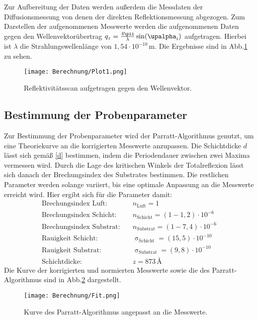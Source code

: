 Zur Aufbereitung der Daten werden außerdem die Messdaten der Diffusionsmessung von denen der direkten Reflektionsmessung abgezogen. Zum Darstellen der aufgenommenen Messwerte werden die aufgenommenen Daten gegen den Wellenvektorübertrag $q_z=\frac{4\pii}{\lambda}\sin(\upalpha_i)$ aufgetragen. Hierbei ist $\lambda$ die Strahlungswellenlänge von $1{,}54\cdot10^{-10}\,\si{\m}$. Die Ergebnisse sind in Abb.\ref{Plot1} zu sehen.
\begin{figure}[H]
  \centering
  \texttt{[image: Berechnung/Plot1.png]}
  \caption{Reflektivitätsscan aufgetragen gegen den Wellenvektor.}
  \label{Plot1}
\end{figure}
\subsection{Bestimmung der Probenparameter}
Zur Bestimmung der Probenparameter wird der Parratt-Algorithmus genutzt, um eine Theoriekurve an die  korrigierten Messwerte anzupassen. Die Schichtdicke $d$ lässt sich gemäß \eqref{d} bestimmen, indem die Periodendauer zwischen zwei Maxima vermessen wird. Durch die Lage des kritischen Winkels der Totalreflexion lässt sich danach der Brechungsindex des Substrates bestimmen. Die restlichen Parameter werden solange variiert, bis eine optimale Anpassung an die Messwerte erreicht wird. Hier ergibt sich für die Parameter damit:
\begin{align}
  \text{Brechungsindex Luft}:&\quad n_\text{Luft}=1 \nonumber\\
  \text{Brechungsindex Schicht}:&\quad n_\text{Schicht}= \left(1-1,2\right)\cdot10^{-6} \nonumber\\
  \text{Brechungsindex Substrat}:&\quad n_\text{Substrat}=\left(1-7,4\right)\cdot10^{-6} \nonumber\\
  \text{Rauigkeit Schicht}:&\quad \upsigma_\text{Schicht}=\left(15,5\right)\cdot10^{-10} \nonumber\\
  \text{Rauigkeit Substrat}:&\quad \upsigma_\text{Substrat}=\left(9,8\right)\cdot10^{-10} \nonumber\\
  \text{Schichtdicke}:&\quad z=873\,\si{\angstrom}\nonumber
\end{align}
Die Kurve der korrigierten und normierten Messwerte sowie die des Parratt-Algorithmus sind in Abb.\ref{fit} dargestellt.
\begin{figure}[H]
  \centering
  \texttt{[image: Berechnung/Fit.png]}
  \caption{Kurve des Parratt-Algorithmus angepasst an die Messwerte.}
  \label{fit}
\end{figure}
